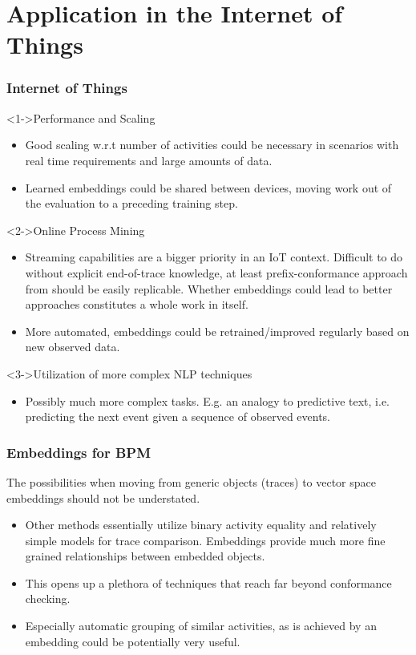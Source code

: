 \documentclass{beamer}
\begin{document}
	\section{Application in the Internet of Things}
	\begin{frame}
		\frametitle{Internet of Things}
		\begin{block}<1->{Performance and Scaling}
			\begin{itemize}
				\item Good scaling w.r.t number of activities could be necessary in scenarios with real time requirements and large amounts of data.
				\item Learned embeddings could be shared between devices, moving work out of the evaluation to a preceding training step.
			\end{itemize}
		\end{block}
	
	\begin{block}<2->{Online Process Mining}
		\begin{itemize}
			\item Streaming capabilities are a bigger priority in an IoT context. Difficult to do without explicit end-of-trace knowledge, at least prefix-conformance approach from \cite{ZBK*19} should be easily replicable. Whether embeddings could lead to better approaches constitutes a whole work in itself.
			\item More automated, embeddings could be retrained/improved regularly based on new observed data.  
		\end{itemize}
	\end{block}

\begin{block}<3->{Utilization of more complex NLP techniques}
	\begin{itemize}
		\item Possibly much more complex tasks. E.g. an analogy to predictive text, i.e. predicting the next event given a sequence of observed events.
	\end{itemize}
\end{block}
	\end{frame}

\begin{frame}
	\frametitle{Embeddings for BPM}
	The possibilities when moving from generic objects (traces) to vector space embeddings should not be understated.
	
	\begin{itemize}
		\item Other methods essentially utilize binary activity equality and relatively simple models for trace comparison. Embeddings provide much more fine grained relationships between embedded objects.
		\item This opens up a plethora of techniques that reach far beyond conformance checking.
		\item Especially automatic grouping of similar activities, as is achieved by an embedding could be potentially very useful.
	\end{itemize}
	 
\end{frame}
\end{document}
